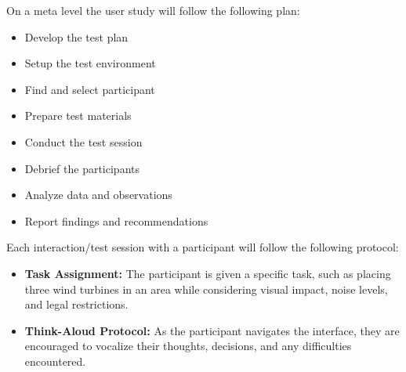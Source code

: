 \documentclass[11pt, titlepage, a4paper]{scrartcl}
\begin{document}
\begin{linenumbers}
    On a meta level the user study will follow the following plan:
    \begin{itemize}
        \item Develop the test plan
        \item Setup the  test environment
        \item Find and select participant
        \item Prepare test materials
        \item Conduct the test session
        \item Debrief the participants
        \item Analyze data and observations
        \item Report findings and recommendations
    \end{itemize}
    \cite{rubinHandbookUsabilityTesting2008}

    Each interaction/test session with a participant will follow the following protocol:
    \begin{itemize}
        \item \textbf{Task Assignment:} The participant is given a specific task, such as placing three wind turbines in an area while considering visual impact, noise levels, and legal restrictions.

        \item \textbf{Think-Aloud Protocol:} As the participant navigates the interface, they are encouraged to vocalize their thoughts, decisions, and any difficulties encountered.


\end{itemize}
\end{linenumbers}
\end{document}
